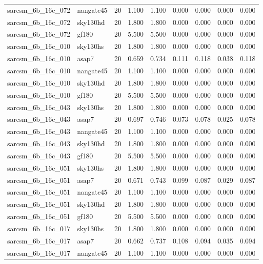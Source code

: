 \begin{tabular}{llrrrrrrr}
sarcsm\_6b\_16c\_072 & nangate45 & 20 & 1.100 & 1.100 & 0.000 & 0.000 & 0.000 & 0.000 \\
sarcsm\_6b\_16c\_072 & sky130hd & 20 & 1.800 & 1.800 & 0.000 & 0.000 & 0.000 & 0.000 \\
sarcsm\_6b\_16c\_072 & gf180 & 20 & 5.500 & 5.500 & 0.000 & 0.000 & 0.000 & 0.000 \\
sarcsm\_6b\_16c\_010 & sky130hs & 20 & 1.800 & 1.800 & 0.000 & 0.000 & 0.000 & 0.000 \\
sarcsm\_6b\_16c\_010 & asap7 & 20 & 0.659 & 0.734 & 0.111 & 0.118 & 0.038 & 0.118 \\
sarcsm\_6b\_16c\_010 & nangate45 & 20 & 1.100 & 1.100 & 0.000 & 0.000 & 0.000 & 0.000 \\
sarcsm\_6b\_16c\_010 & sky130hd & 20 & 1.800 & 1.800 & 0.000 & 0.000 & 0.000 & 0.000 \\
sarcsm\_6b\_16c\_010 & gf180 & 20 & 5.500 & 5.500 & 0.000 & 0.000 & 0.000 & 0.000 \\
sarcsm\_6b\_16c\_043 & sky130hs & 20 & 1.800 & 1.800 & 0.000 & 0.000 & 0.000 & 0.000 \\
sarcsm\_6b\_16c\_043 & asap7 & 20 & 0.697 & 0.746 & 0.073 & 0.078 & 0.025 & 0.078 \\
sarcsm\_6b\_16c\_043 & nangate45 & 20 & 1.100 & 1.100 & 0.000 & 0.000 & 0.000 & 0.000 \\
sarcsm\_6b\_16c\_043 & sky130hd & 20 & 1.800 & 1.800 & 0.000 & 0.000 & 0.000 & 0.000 \\
sarcsm\_6b\_16c\_043 & gf180 & 20 & 5.500 & 5.500 & 0.000 & 0.000 & 0.000 & 0.000 \\
sarcsm\_6b\_16c\_051 & sky130hs & 20 & 1.800 & 1.800 & 0.000 & 0.000 & 0.000 & 0.000 \\
sarcsm\_6b\_16c\_051 & asap7 & 20 & 0.671 & 0.743 & 0.099 & 0.087 & 0.029 & 0.087 \\
sarcsm\_6b\_16c\_051 & nangate45 & 20 & 1.100 & 1.100 & 0.000 & 0.000 & 0.000 & 0.000 \\
sarcsm\_6b\_16c\_051 & sky130hd & 20 & 1.800 & 1.800 & 0.000 & 0.000 & 0.000 & 0.000 \\
sarcsm\_6b\_16c\_051 & gf180 & 20 & 5.500 & 5.500 & 0.000 & 0.000 & 0.000 & 0.000 \\
sarcsm\_6b\_16c\_017 & sky130hs & 20 & 1.800 & 1.800 & 0.000 & 0.000 & 0.000 & 0.000 \\
sarcsm\_6b\_16c\_017 & asap7 & 20 & 0.662 & 0.737 & 0.108 & 0.094 & 0.035 & 0.094 \\
sarcsm\_6b\_16c\_017 & nangate45 & 20 & 1.100 & 1.100 & 0.000 & 0.000 & 0.000 & 0.000 \\

\end{tabular}
